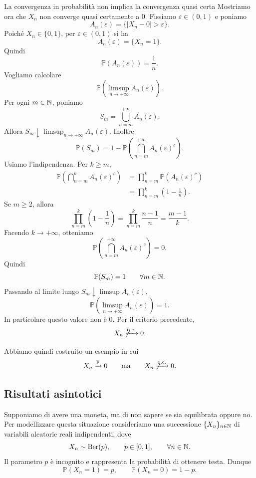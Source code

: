 \documentclass[a4paper]{article}
\begin{document}
\begin{snippetexample}{La convergenza in probabilità non implica la convergenza quasi certa}
    Mostriamo ora che \(X_n\) non converge quasi certamente a \(0\). Fissiamo \(\varepsilon\in(0,1)\) e poniamo
    \[
        A_n(\varepsilon)=\{|X_n-0|>\varepsilon\}.
    \]
    Poiché \(X_n\in\{0,1\}\), per \(\varepsilon\in(0,1)\) si ha
    \[
        A_n(\varepsilon)=\{X_n=1\}.
    \]
    Quindi
    \[
        \mathbb{P}(A_n(\varepsilon))=\frac1n.
    \]
    Vogliamo calcolare
    \[
        \mathbb{P}\left(\limsup_{n\to+\infty}A_n(\varepsilon)\right).
    \]
    Per ogni \(m\in\mathbb{N}\), poniamo
    \[
        S_m=\bigcup_{n=m}^{+\infty}A_n(\varepsilon).
    \]
    Allora \(S_m\downarrow\limsup_{n\to+\infty}A_n(\varepsilon)\). Inoltre
    \[
        \mathbb{P}(S_m)
        =
        1-\mathbb{P}\left(\bigcap_{n=m}^{+\infty}A_n(\varepsilon)^c\right).
    \]
    Usiamo l'indipendenza. Per \(k\geq m\),
    \begin{align*}
        \mathbb{P}\left(\bigcap_{n=m}^{k}A_n(\varepsilon)^c\right)
        &=
        \prod_{n=m}^{k}\mathbb{P}(A_n(\varepsilon)^c)\\
        &=
        \prod_{n=m}^{k}\left(1-\frac1n\right).
    \end{align*}
    Se \(m\geq 2\), allora
    \[
        \prod_{n=m}^{k}\left(1-\frac1n\right)
        =
        \prod_{n=m}^{k}\frac{n-1}{n}
        =
        \frac{m-1}{k}.
    \]
    Facendo \(k\to+\infty\), otteniamo
    \[
        \mathbb{P}\left(\bigcap_{n=m}^{+\infty}A_n(\varepsilon)^c\right)=0.
    \]
    Quindi
    \[
        \mathbb{P}(S_m)=1
        \qquad
        \forall m\in\mathbb{N}.
    \]
    Passando al limite lungo \(S_m\downarrow\limsup A_n(\varepsilon)\),
    \[
        \mathbb{P}\left(\limsup_{n\to+\infty}A_n(\varepsilon)\right)=1.
    \]
    In particolare questo valore non è \(0\). Per il criterio precedente,
    \[
        X_n\not\xrightarrow{\text{q.c.}}0.
    \]

    Abbiamo quindi costruito un esempio in cui
    \[
        X_n\xrightarrow{\mathbb{P}}0
        \qquad
        \text{ma}
        \qquad
        X_n\not\xrightarrow{\text{q.c.}}0.
    \]
\end{snippetexample}

\subsection{Risultati asintotici}

Supponiamo di avere una moneta, ma di non sapere se sia equilibrata oppure no. Per modellizzare questa situazione consideriamo una successione \(\{X_n\}_{n\in\mathbb{N}}\) di variabili aleatorie reali indipendenti, dove
\[
    X_n\sim \operatorname{Ber}(p),
    \qquad
    p\in[0,1],
    \qquad
    \forall n\in\mathbb{N}.
\]
Il parametro \(p\) è incognito e rappresenta la probabilità di ottenere testa. Dunque
\[
    \mathbb{P}(X_n=1)=p,
    \qquad
    \mathbb{P}(X_n=0)=1-p.
\]
\end{document}
